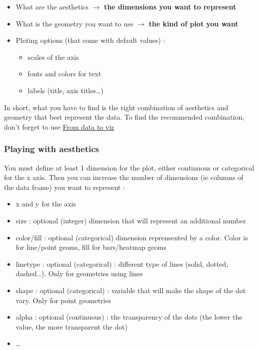 \documentclass[
]{book}
\providecommand{\tightlist}{%
  \setlength{\itemsep}{0pt}\setlength{\parskip}{0pt}}
\begin{document}
\begin{itemize}
\tightlist
\item
  What are the aesthetics \(\rightarrow\) \textbf{the dimensions you want to represent}
\item
  What is the geometry you want to use \(\rightarrow\) \textbf{the kind of plot you want}
\item
  Ploting options (that come with default values) :

  \begin{itemize}
  \tightlist
  \item
    scales of the axis
  \item
    fonts and colors for text
  \item
    labels (title, axis titles\ldots)
  \end{itemize}
\end{itemize}

In short, what you have to find is the right combination of aesthetics and geometry that best represent the data. To find the recommended combination, don't forget to use \href{https://www.data-to-viz.com/}{From data to viz}

\hypertarget{playing-with-aesthetics}{%
\subsubsection{Playing with aesthetics}\label{playing-with-aesthetics}}

You must define at least 1 dimension for the plot, either continuous or categorical for the x axis. Then you can increase the number of dimensions (ie columns of the data frame) you want to represent :

\begin{itemize}
\tightlist
\item
  x and y for the axis
\item
  size : optional (integer) dimension that will represent an additional number
\item
  color/fill : optional (categorical) dimension reprensented by a color. Color is for line/point geoms, fill for bars/heatmap geoms
\item
  linetype : optional (categorical) : different type of lines (solid, dotted, dashed\ldots). Only for geometries using lines
\item
  shape : optional (categorical) : variable that will make the shape of the dot vary. Only for point geometries
\item
  alpha : optional (continuous) : the transparency of the dots (the lower the value, the more transparent the dot)
\item
  \ldots{}
\end{itemize}
\end{document}
